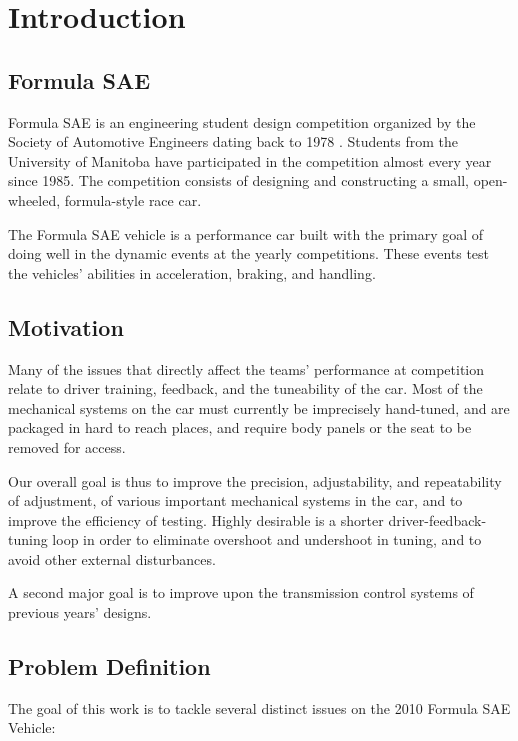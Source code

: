 \chapter{Introduction}

\section{Formula SAE}

Formula SAE is an engineering student design competition organized by the Society of Automotive Engineers dating back to 1978 \cite{fsaehistory}. Students from the University of Manitoba have participated in the competition almost every year since 1985. The competition consists of designing and constructing a small, open-wheeled, formula-style race car.

The Formula SAE vehicle is a performance car built with the primary goal of doing well in the dynamic events at the yearly competitions. These events test the vehicles' abilities in acceleration, braking, and handling. 

\section{Motivation}

Many of the issues that directly affect the teams' performance at competition relate to driver training, feedback, and the tuneability of the car. Most of the mechanical systems on the car must currently be imprecisely hand-tuned, and are packaged in hard to reach places, and require body panels or the seat to be removed for access.

Our overall goal is thus to improve the precision, adjustability, and repeatability of adjustment, of various important mechanical systems in the car, and to improve the efficiency of testing. Highly desirable is a shorter driver-feedback-tuning loop in order to eliminate overshoot and undershoot in tuning, and to avoid other external disturbances.

A second major goal is to improve upon the transmission control systems of previous years' designs.

\section{Problem Definition}

The goal of this work is to tackle several distinct issues on the 2010 Formula SAE Vehicle:

